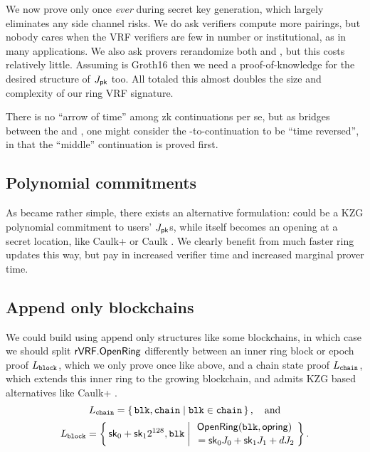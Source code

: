 We now prove \pisk only once {\it ever} during secret key generation,
which largely eliminates any side channel risks.
We do ask verifiers compute more pairings, but nobody cares when
the VRF verifiers are few in number or institutional,
as in many applications.
We also ask provers rerandomize both \pisk and \pipk, but this costs relatively little.
Assuming \pipk is Groth16 then we need a proof-of-knowledge for the desired structure of $J_\mathsf{pk}$ too.
All totaled this almost doubles the size and complexity of our ring VRF signature.

There is no ``arrow of time'' among zk continuations per se, but
as \pisk bridges between the \PedVRF and \pipk,
one might consider the \pisk-to-\pipk continuation to be ``time reversed'',
 in that the ``middle'' continuation is proved first.


\subsection{Polynomial commitments}
\label{subsec:rvrf_caulk}

As \pipk became rather simple, %
there exists an alternative formulation:  
\comring could be a KZG polynomial commitment \cite{KZG} to users' $J_\mathsf{pk}$s,
while \pipk itself becomes an opening at a secret location, like
Caulk+ \cite{caulk+} or Caulk \cite{caulk}.
We clearly benefit from much faster ring updates this way, but pay in
 increased verifier time and increased marginal prover time.


\subsection{Append only blockchains}

\def\comblock{\ensuremath{\mathsf{comblock}}\xspace}
\newcommand\pichain{\ensuremath{\pi_{\mathtt{chain}}}\xspace}

We could build \ring using append only structures like some blockchains,
in which case we should split ${\mathsf{rVRF}}.{\mathsf{OpenRing}}$ differently between
an inner ring block or epoch proof $L_{\mathtt{block}}$,
 which we only prove once like \pisk above, and
a chain state proof $L_{\mathtt{chain}}$,
 which extends this inner ring to the growing blockchain, and
 admits KZG based alternatives like Caulk+ \cite{caulk+}.
%
$$ \baseL_{\mathtt{chain}} = \Setst{ \mathtt{blk}, \mathtt{chain} }{
	\mathtt{blk} \in \mathtt{chain}
} \mathcomma \quad\textrm{and} $$ 
%
$$ \baseL_{\mathtt{block}} = \Setst{ \sk_0 + \sk_1 2^{128}, \mathtt{blk} }{
	\eprint{\exists d,\openring \textrm{\ s.t.\ }}{}
	\genfrac{}{}{0pt}{}{ \OpenRing(\mathtt{blk},\openring) }{ \,\, = \sk_0 \genJ_0 + \sk_1 \genJ_1 + d \genJ_2 }
} \mathperiod $$  

